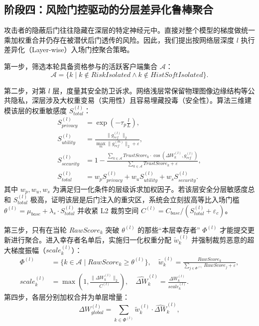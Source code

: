 \documentclass[11pt, a4paper, UTF8, fontset=fandol]{ctexart}
\begin{document}
\subsection{阶段四：风险门控驱动的分层差异化鲁棒聚合}
攻击者的隐蔽后门往往隐藏在深层的特定神经元中。直接对整个模型的梯度做统一乘加权重合并仍存在被潜伏后门透传的风险。因此，我们提出按网络层深度 $l$ 执行差异化（Layer-wise）入场门控聚合策略。

第一步，筛选本轮具备资格参与的活跃客户端集合 $\mathcal{A}$：
\begin{equation} \label{eq:active_clients}
    \mathcal{A} = \{k \mid k \notin RiskIsolated \land k \notin HistSoftIsolated\}.
\end{equation}

第二步，对第 $l$ 层，度量其安全防卫诉求。网络浅层常保留物理图像边缘结构等公共隐私，深层涉及大权重变易（实用性）且容易埋藏投毒（安全性）。算法三维建模该层的权重敏感度 $S_{total}^{(l)}$：
\begin{align}
    S_{privacy}^{(l)} &= \exp\left(-\tau_{p} \frac{l}{L}\right), \\
    S_{utility}^{(l)} &= \frac{\|g_{ref}^{(l)}\|_{2}}{\max_{m}\|g_{ref}^{(m)}\|_{2} + \varepsilon}, \\
    S_{security}^{(l)} &= 1 - \frac{\sum_{k\in\mathcal{A}}TrustScore_{k}\cdot\cos(\Delta W_{k}^{(l)}, g_{ref}^{(l)})}{\sum_{k\in\mathcal{A}}TrustScore_{k} + \varepsilon}, \\
    S_{total}^{(l)} &= w_p S_{privacy}^{(l)} + w_u S_{utility}^{(l)} + w_s S_{security}^{(l)}.
\end{align}
其中 $w_p, w_u, w_s$ 为满足归一化条件的层级诉求加权因子。若该层安全分层敏感度总和 $S_{total}^{(l)}$ 极高，证明该层是后门注入的重灾区，系统会立刻拔高等比入场门槛 $\theta^{(l)} = \mu_{base} + \lambda_{s} \cdot S_{total}^{(l)}$ 并收紧 L2 裁剪空间 $C^{(l)} = C_{base} / (S_{total}^{(l)} + \varepsilon_{c})$。

第三步，只有在当轮 $RawScore_k$ 突破 $\theta^{(l)}$ 的那些“本层幸存者” $\Phi^{(l)}$ 才能提交更新进行聚合。进入幸存者名单后，实施归一化权重分配 $\tilde{w}_{k}^{(l)}$ 并强制裁剪恶意的超大梯度振幅（$scale_k^{(l)}$）：
\begin{align}
    \Phi^{(l)} &= \{k \in \mathcal{A} \mid RawScore_{k} \ge \theta^{(l)} \}, \quad \tilde{w}_{k}^{(l)} = \frac{RawScore_{k}}{\sum_{j\in\Phi^{(l)}}RawScore_{j} + \varepsilon}, \\
    scale_{k}^{(l)} &= \max\left(1, \frac{\|\Delta W_{k}^{(l)}\|_{2}}{C^{(l)}}\right), \quad
    \widehat{\Delta W}_{k}^{(l)} = \frac{\Delta W_{k}^{(l)}}{scale_{k}^{(l)}}.
\end{align}
第四步，各层分别加权合并为单层增量：
\begin{equation}
    \Delta W_{global}^{(l)} = \sum_{k\in\Phi^{(l)}}\tilde{w}_{k}^{(l)} \cdot \widehat{\Delta W}_{k}^{(l)},
\end{equation}
\end{document}
